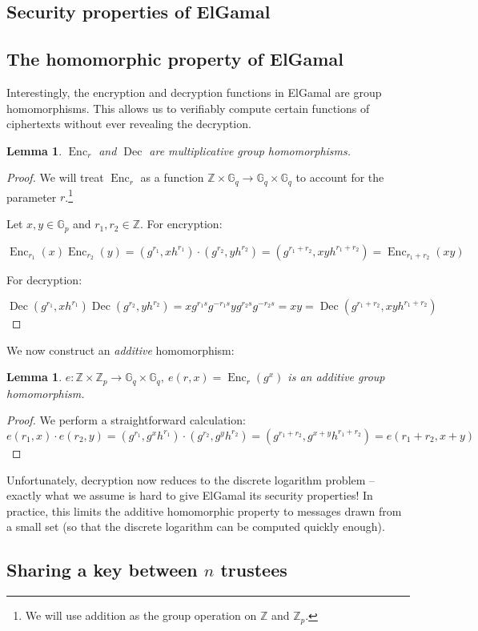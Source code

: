 \documentclass[11pt,twoside,a4paper]{article}
\DeclareMathOperator{\Enc}{Enc}
\DeclareMathOperator{\Dec}{Dec}
\newtheorem{lemma}[theorem]{Lemma}
\theoremstyle{definition}
\begin{document}
\subsection{Security properties of ElGamal}
\subsection{The homomorphic property of ElGamal}
Interestingly, the encryption and decryption functions in ElGamal are group homomorphisms. This allows us to verifiably compute certain functions of ciphertexts without ever revealing the decryption.
\begin{lemma}\label{lem-mul-homom}
    \(\Enc_r\) and \(\Dec\) are multiplicative group homomorphisms.
\end{lemma}
\begin{proof}
    We will treat \(\Enc_r\) as a function \(\mathbb{Z}\times\mathbb{G}_q\rightarrow\mathbb{G}_q\times\mathbb{G}_q\) to account for the parameter \(r\).\footnote{We will use addition as the group operation on \(\mathbb{Z}\) and \(\mathbb{Z}_p\).}

    Let \(x,y\in\mathbb{G}_p\) and \(r_1,r_2\in\mathbb{Z}\). For encryption:
    
    \[\Enc_{r_1}(x)\Enc_{r_2}(y)=(g^{r_1},xh^{r_1})\cdot(g^{r_2},yh^{r_2})=(g^{r_1+r_2},xyh^{r_1+r_2})=\Enc_{r_1+r_2}(xy)\]

    For decryption:

    \[\Dec(g^{r_1},xh^{r_1})\Dec(g^{r_2},yh^{r_2})=xg^{r_1s}g^{-r_1s}yg^{r_2s}g^{-r_2s}=xy=\Dec(g^{r_1+r_2},xyh^{r_1+r_2})\]
\end{proof}

We now construct an \textit{additive} homomorphism:
\begin{lemma}
    \(e:\mathbb{Z}\times\mathbb{Z}_{p}\rightarrow\mathbb{G}_q\times\mathbb{G}_q,\ e(r, x)=\Enc_r(g^x)\) is an additive group homomorphism.
\end{lemma}
\begin{proof}
    We perform a straightforward calculation:
    \[e(r_1, x)\cdot e(r_2,y)=(g^{r_1},g^xh^{r_1})\cdot(g^{r_2},g^yh^{r_2})=(g^{r_1+r_2},g^{x+y}h^{r_1+r_2})=e(r_1+r_2, x+y)\]
\end{proof}
Unfortunately, decryption now reduces to the discrete logarithm problem -- exactly what we assume is hard to give ElGamal its security properties! In practice, this limits the additive homomorphic property to messages drawn from a small set (so that the discrete logarithm can be computed quickly enough).
\subsection{Sharing a key between \(n\) trustees}
\vfill\pagebreak
\end{document}
